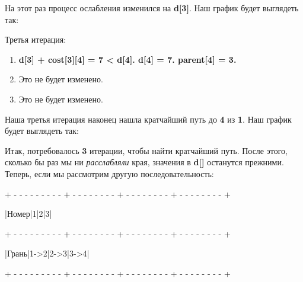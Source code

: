 На этот раз процесс ослабления изменился на \textbf{d[3]}. Наш график будет выглядеть так:


Третья итерация:

\begin{enumerate}
\item \textbf{d[3] + cost[3][4] = 7 < d[4]. d[4] = 7. parent[4] = 3.}
\item Это не будет изменено.
\item Это не будет изменено.
\end{enumerate}

Наша третья итерация наконец нашла кратчайший путь до \textbf{4} из \textbf{1}. Наш график будет выглядеть так:


Итак, потребовалось \textbf{3} итерации, чтобы найти кратчайший путь. После этого, сколько бы раз мы ни \textit{расслабляли} края, значения в \textbf{d[]} останутся прежними. Теперь, если мы рассмотрим другую последовательность:

\begin{tcolorbox}
{\tiny+ -  -  -  -  -  -  -  -  -  + -  -  -  -  -  -  -  -  + -  -  -  -  -  -  -  -  + -  -  -  -  -  -  -  -  +}

\hspace{0.4mm}|\hspace{2.7mm}Номер\hspace{2.7mm}|\hspace{6.82mm}1\hspace{6.82mm}|\hspace{6.82mm}2\hspace{6.82mm}|\hspace{6.82mm}3\hspace{6.82mm}|

{\tiny+ - - - - - - - - - + - - - - - - - - + - - - - - - - - + - - - - - - - - +}

\hspace{0.4mm}|\hspace{3mm}Грань\hspace{3mm}|\hspace{3.55mm}1->2\hspace{3.55mm}|\hspace{3.55mm}2->3\hspace{3.55mm}|\hspace{3.55mm}3->4\hspace{3.55mm}|

{\tiny+ - - - - - - - - - + - - - - - - - - + - - - - - - - - + - - - - - - - - +}
\end{tcolorbox}

